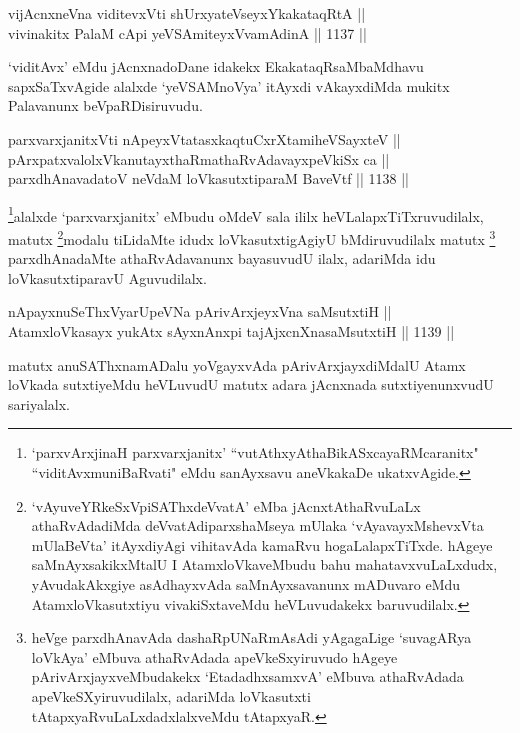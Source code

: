 \begin{shl}
vijAcnxneVna viditevxVti shUrxyateV\s seyxYkakataqRtA || \\
vivinakitx PalaM cApi yeVSAmiteyxVvamAdinA \hfill || 1137 ||  
\end{shl}

\begin{artha}
`viditAvx' eMdu jAcnxnadoDane idakekx EkakataqRsaMbaMdhavu sapxSaTxvAgide alalxde `yeVSAMnoV\s ya' itAyxdi vAkayxdiMda mukitx Palavanunx beVpaRDisiruvudu.
\end{artha}

\begin{shl}
parxvarxjanitxVti nApeyxVtatasxkaqtuCxrXtamiheVSayxteV || \\
pArxpatxvalolxVkanutayxthaRmathaRvAdavayxpeVkiSx ca || \\
parxdhAnavadatoV neVdaM loVkasutxtiparaM BaveVtf \hfill || 1138 ||  
\end{shl}

\begin{artha}
\footnote{`parxvArxjinaH parxvarxjanitx' ``vutAthxyAthaBikASxcayaRMcaranitx" ``viditAvxmuniBaRvati" eMdu sanAyxsavu aneVkakaDe ukatxvAgide.}alalxde `parxvarxjanitx' eMbudu oMdeV sala ililx heVLalapxTiTxruvudilalx, matutx \footnote{`vAyuveYRkeSxVpiSAThxdeVvatA' eMba jAcnxtAthaRvuLaLx athaRvAdadiMda deVvatAdiparxshaMseya mUlaka `vAyavayxMshevxVta mUlaBeVta' itAyxdiyAgi vihitavAda kamaRvu hogaLalapxTiTxde. hAgeye saMnAyxsakikxMtalU I AtamxloVkaveMbudu bahu mahatavxvuLaLxdudx, yAvudakAkxgiye asAdhayxvAda saMnAyxsavanunx mADuvaro eMdu AtamxloVkasutxtiyu vivakiSxtaveMdu heVLuvudakekx baruvudilalx.}modalu tiLidaMte idudx loVkasutxtigAgiyU bMdiruvudilalx matutx \footnote{heVge parxdhAnavAda dashaRpUNaRmAsAdi yAgagaLige `suvagARya loVkAya' eMbuva athaRvAdada apeVkeSxyiruvudo hAgeye pArivArxjayxveMbudakekx `EtadadhxsamxvA' eMbuva athaRvAdada apeVkeSXyiruvudilalx, adariMda loVkasutxti tAtapxyaRvuLaLxdadxlalxveMdu tAtapxyaR.} parxdhAnadaMte athaRvAdavanunx bayasuvudU ilalx, adariMda idu loVkasutxtiparavU Aguvudilalx.
\end{artha}

\begin{shl}
nApayxnuSeThxVyarUpeVNa pArivArxjeyxVna saMsutxtiH || \\
AtamxloVkasayx yukAtx sAyxnAnxpi tajAjxcnXnasaMsutxtiH \hfill || 1139 ||  
\end{shl}

\begin{artha}
matutx anuSAThxnamADalu yoVgayxvAda pArivArxjayxdiMdalU Atamx loVkada sutxtiyeMdu heVLuvudU matutx adara jAcnxnada sutxtiyenunxvudU sariyalalx.
\end{artha}

